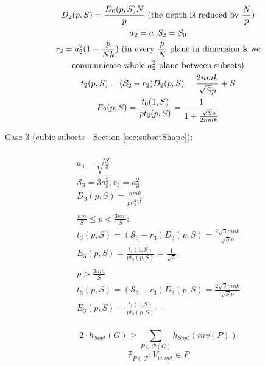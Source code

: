 \documentclass[sigplan,review,anonymous]{acmart}\settopmatter{printfolios=true,printccs=false,printacmref=false}
\begin{document}
\begin{multline}
\\
D_2(p,S) = \frac{D_0(p,S)N}{p} \text{ (the depth is reduced by } \frac{N}{p} 
\text{)}\\
a_2 = a , \mathcal{S}_2 = \mathcal{S}_0\\ 
r_2 = a_2^2(1 - \frac{p}{Nk}) \text{ (in every $\frac{p}{N}$ plane in dimension 
	\textbf{k} we} \\
\text{communicate whole $a_2^2$ plane between subsets)} \\
t_2(p,S) = (\mathcal{S}_2 - r_2) D_2(p,S) = \frac{2nmk}{\sqrt{S}p} + S \\
E_2(p,S) = \frac{t_0(1,S)}{p t_2(p,S)} = \frac{1}{1 + \frac{\sqrt{S}p}{2nmk}} \\
\end{multline}

Case 3 (cubic subsets - Section \ref{sec:subsetShape}):

\begin{multline}
\\
a_3 = \sqrt{\frac{S}{3}} \\ 
\mathcal{S}_3 = 3a_3^2, r_3 = a_3^2\\ 
D_3(p,S) = \frac{nmk}{p \Big(\frac{S}{3}\Big)^{\frac{3}{2}}}\\
\\
\frac{nm}{S} \le p < \frac{3nm}{S} :\\
t_3(p,S) = (\mathcal{S}_3 - r_3) D_3(p,S) = \frac{2\sqrt{3}mnk}{\sqrt{S}p} \\
E_3(p,S) = \frac{t_1(1,S)}{p t_3(p,S)} = \frac{1}{\sqrt{3}}\\
\\
p > \frac{3nm}{S} :\\
t_3(p,S) = (\mathcal{S}_3 - r_3) D_3(p,S) = \frac{2\sqrt{3}mnk}{\sqrt{S}p} \\
E_3(p,S) = \frac{t_1(1,S)}{p t_3(p,S)} = \\
\end{multline}

$$2 \cdot h_{Sopt}(G) \ge \sum_{P \in \mathcal{P}(G)} h_{Sopt}(inv(P)) $$
$$ \nexists_{P \in \mathcal{P}}: V_{w,opt} \in P $$

\end{document}
